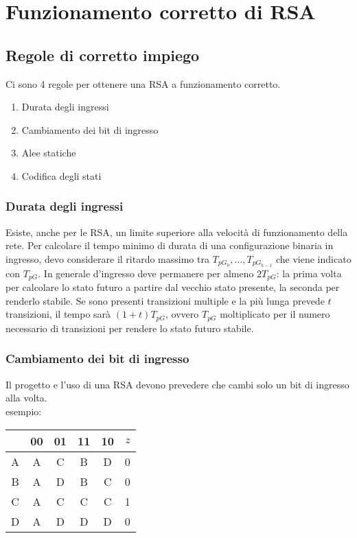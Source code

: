 \documentclass{article}
\begin{document}
\section{Funzionamento corretto di RSA}

\subsection{Regole di corretto impiego}

Ci sono 4 regole per ottenere una RSA a funzionamento corretto.

\begin{enumerate}
    \item Durata degli ingressi
    \item Cambiamento dei bit di ingresso
    \item Alee statiche
    \item Codifica degli stati
\end{enumerate}

\subsubsection{Durata degli ingressi}

Esiste, anche per le RSA, un limite superiore alla velocità di funzionamento della rete.
Per calcolare il tempo minimo di durata di una configurazione binaria in ingresso, devo considerare il ritardo massimo tra $T_{pG_0}, \dots, T_{pG_{k-1}}$ che viene indicato con $T_{pG}$.
In generale d'ingresso deve permanere per almeno $2T_{pG}$: la prima volta per calcolare lo stato futuro a partire dal vecchio stato presente, la seconda per renderlo stabile.
Se sono presenti transizioni multiple e la più lunga prevede $t$ transizioni, il tempo sarà $(1 + t)T_{pG}$, ovvero $T_{pG}$ moltiplicato per il numero necessario di transizioni per rendere lo stato futuro stabile.

\subsubsection{Cambiamento dei bit di ingresso}

Il progetto e l'uso di una RSA devono prevedere che cambi solo un bit di ingresso alla volta.\\

\noindent
esempio:

\begin{center}
\begin{tabular}{ |c|c|c|c|c|c| }
\hline
& 00 & 01 & 11 & 10 & $z$ \\
\hline
\hline
A & A & C & B & D & 0 \\
B & A & D & B & C & 0 \\
C & A & C & C & C & 1 \\
D & A & D & D & D & 0 \\
\hline
\end{tabular}
\end{center}
\end{document}
